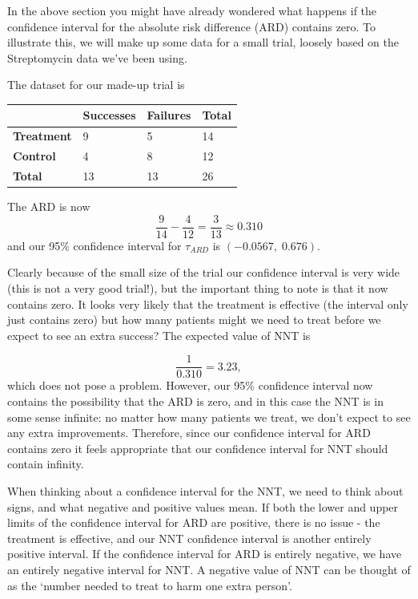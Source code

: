 \documentclass[
  openany]{book}
\theoremstyle{definition}
\theoremstyle{definition}
\theoremstyle{definition}
\theoremstyle{definition}
\theoremstyle{remark}
\begin{document}
In the above section you might have already wondered what happens if the confidence interval for the absolute risk difference (ARD) contains zero. To illustrate this, we will make up some data for a small trial, loosely based on the Streptomycin data we've been using.

The dataset for our made-up trial is

\begin{longtable}[]{@{}llll@{}}
\toprule\noalign{}
& Successes & Failures & Total \\
\midrule\noalign{}
\endhead
\bottomrule\noalign{}
\endlastfoot
\textbf{Treatment} & 9 & 5 & 14 \\
\textbf{Control} & 4 & 8 & 12 \\
\textbf{Total} & 13 & 13 & 26 \\
\end{longtable}

The ARD is now
\[\frac{9}{14} - \frac{4}{12} = \frac{3}{13} \approx 0.310 \]
and our 95\% confidence interval for \(\tau_{ARD}\) is \(\left(-0.0567,\;0.676\right)\).

Clearly because of the small size of the trial our confidence interval is very wide (this is not a very good trial!), but the important thing to note is that it now contains zero. It looks very likely that the treatment is effective (the interval only just contains zero) but how many patients might we need to treat before we expect to see an extra success? The expected value of NNT is

\[ \frac{1}{0.310} = 3.23,\]
which does not pose a problem. However, our 95\% confidence interval now contains the possibility that the ARD is zero, and in this case the NNT is in some sense infinite: no matter how many patients we treat, we don't expect to see any extra improvements. Therefore, since our confidence interval for ARD contains zero it feels appropriate that our confidence interval for NNT should contain infinity.

When thinking about a confidence interval for the NNT, we need to think about signs, and what negative and positive values mean. If both the lower and upper limits of the confidence interval for ARD are positive, there is no issue - the treatment is effective, and our NNT confidence interval is another entirely positive interval. If the confidence interval for ARD is entirely negative, we have an entirely negative interval for NNT. A negative value of NNT can be thought of as the `number needed to treat to harm one extra person'.
\end{document}
